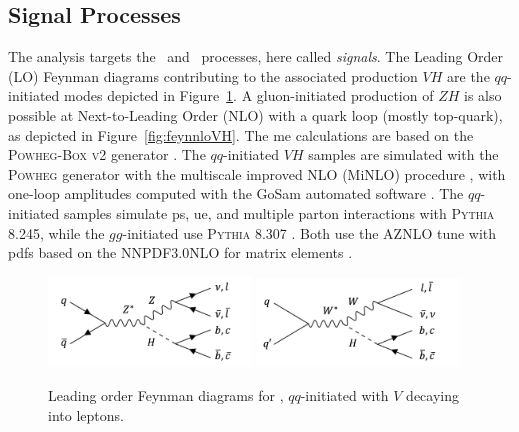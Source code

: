 \subsection{Signal Processes}
The analysis targets the \vhb\ and \vhc\ processes, here called \textit{signals}. The Leading Order (LO) Feynman diagrams contributing to the associated production $VH$ are the $qq$-initiated modes depicted in Figure~\ref{fig:feynloVH}. A gluon-initiated production of $ZH$ is also possible at Next-to-Leading Order (NLO) with a quark loop (mostly top-quark), as depicted in Figure~\ref{fig:feynnloVH}. The \gls{me} calculations are based on the \textsc{Powheg-Box v2} generator \cite{StefanoFrixione_20072, POWHEGBOX}. The $qq$-initiated $VH$ samples are simulated with the \textsc{Powheg} generator with the multiscale improved NLO (MiNLO) procedure \cite{powhegHW}, with one-loop amplitudes computed with the GoSam automated software \cite{gosam}. The $qq$-initiated samples simulate \gls{ps}, \gls{ue}, and multiple parton interactions with \textsc{Pythia} 8.245, while the $gg$-initiated use \textsc{Pythia} 8.307 \cite{SJOSTRAND2015159}. Both use the AZNLO tune \cite{measureZGboson} with \gls{pdf}s based on the \textsc{NNPDF3.0NLO} for matrix elements \cite{PDFLHCrun2}. \\

\begin{figure}[h!]
  \center
  \includegraphics[width=0.48\textwidth]{Images/VH/Feynman/zh.png}
  \includegraphics[width=0.48\textwidth]{Images/VH/Feynman/wh.png}
  \caption{Leading order Feynman diagrams for \vhbc, $qq$-initiated with $V$ decaying into leptons.} 
  \label{fig:feynloVH}
\end{figure}

